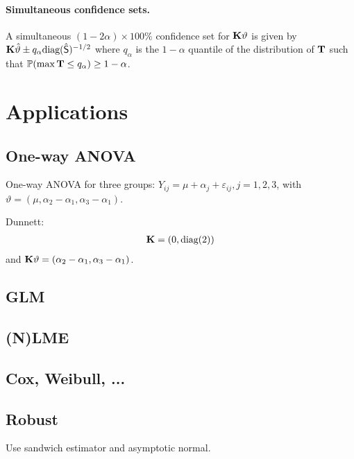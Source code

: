 \documentclass[12pt]{article}
\begin{document}
\paragraph{Simultaneous confidence sets.}

A simultaneous $(1 - 2\alpha) \times 100\%$ 
confidence set for $\mathbf{K} \vartheta$ is given by 
$\mathbf{K} \hat{\vartheta} \pm q_\alpha \text{diag}(\hat{\textsf{S}})^{-1/2}$
where $q_\alpha$ is the $1 - \alpha$ 
quantile of the distribution of $\mathbf{T}$ 
such that $\mathbb{P}(\max{\mathbf{T}} \le q_\alpha) \ge 1 - \alpha$.

\section{Applications}

\subsection{One-way ANOVA}

One-way ANOVA for three groups:
$Y_{ij} = \mu + \alpha_{j} + \varepsilon_{ij}, j = 1, 2, 3$,
with $\vartheta = (\mu, \alpha_2 - \alpha_1, \alpha_3 - \alpha_1)$.

Dunnett: 
\begin{eqnarray*}
\mathbf{K} = (0, \text{diag}(2))
\end{eqnarray*}
and $\mathbf{K} \vartheta = (\alpha_2 - \alpha_1, \alpha_3 - \alpha_1)$.

\subsection{GLM}

\subsection{(N)LME}

\subsection{Cox, Weibull, ...}

\subsection{Robust}

Use sandwich estimator and asymptotic normal.





\end{document}
